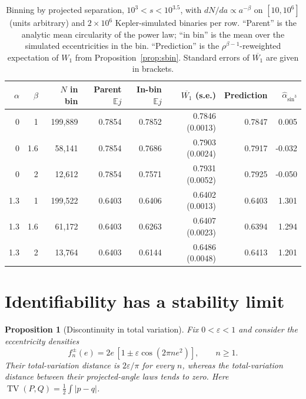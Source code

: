 \documentclass[11pt,a4paper]{article}
\newtheorem{proposition}[theorem]{Proposition}
\theoremstyle{remark}\newtheorem{remark}[theorem]{Remark}
\DeclareMathOperator{\TV}{TV}
\newcommand{\E}{\mathbb E}
\begin{document}
\begin{table}[tb]
\centering
\caption{Binning by projected separation, $10^3<s<10^{3.5}$, with $dN/da\propto a^{-\beta}$ on $[10,10^6]$ (units arbitrary) and $2\times10^6$ Kepler-simulated binaries per row. ``Parent'' is the analytic mean circularity of the power law; ``in bin'' is the mean over the simulated eccentricities in the bin. ``Prediction'' is the $\rho^{\beta-1}$-reweighted expectation of $W_1$ from Proposition~\ref{prop:sbin}. Standard errors of $\overline{W_1}$ are given in brackets.}\label{tab:sbin}
\begin{tabular}{rrrrrrrr}
\toprule
$\alpha$ & $\beta$ & $N$ in bin & Parent $\E j$ & In-bin $\E j$ & $\overline{W_1}$ (s.e.) & Prediction & $\widehat\alpha_{\sin^3}$\\
\midrule
0 & 1 & 199,889 & 0.7854 & 0.7852 & 0.7846 (0.0013) & 0.7847 & 0.005\\
0 & 1.6 & 58,141 & 0.7854 & 0.7686 & 0.7903 (0.0024) & 0.7917 & -0.032\\
0 & 2 & 12,612 & 0.7854 & 0.7571 & 0.7931 (0.0052) & 0.7925 & -0.050\\
1.3 & 1 & 199,522 & 0.6403 & 0.6406 & 0.6402 (0.0013) & 0.6403 & 1.301\\
1.3 & 1.6 & 61,172 & 0.6403 & 0.6263 & 0.6407 (0.0023) & 0.6394 & 1.294\\
1.3 & 2 & 13,764 & 0.6403 & 0.6144 & 0.6486 (0.0048) & 0.6413 & 1.201\\
\bottomrule
\end{tabular}
\end{table}

\section{Identifiability has a stability limit}\label{sec:stability}

\begin{proposition}[Discontinuity in total variation]\label{prop:TV}
Fix $0<\varepsilon<1$ and consider the eccentricity densities
\begin{equation}
f_n^{\pm}(e)=2e\,[1\pm\varepsilon\cos(2\pi n e^2)],\qquad n\ge1.
\end{equation}
Their total-variation distance is $2\varepsilon/\pi$ for every $n$, whereas the total-variation distance between their projected-angle laws tends to zero. Here $\TV(P,Q)=\tfrac12\int|p-q|$.
\end{proposition}
\end{document}
